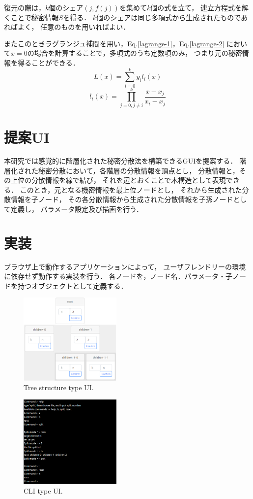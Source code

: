 \documentclass[twocolumn, fleqn, uplatex]{jsarticle}
\begin{document}
復元の際は，$k$個のシェア$(j,f(j))$を集めて$k$個の式を立て，%
連立方程式を解くことで秘密情報$S$を得る．
$k$個のシェアは同じ多項式から生成されたものであればよく，%
任意のものを用いればよい．

またこのときラグランジュ補間を用い，Eq.\ref{lagrange-1}，Eq.\ref{lagrange-2}%
において$x=0$の場合を計算することで，多項式のうち定数項のみ，%
つまり元の秘密情報を得ることができる．
%
\begin{equation}
L(x) = \sum_{i=0}^{k}y_{i}l_{i}(x) \label{lagrange-1}
\end{equation}
%
\begin{equation}
l_{i}(x) = \prod_{j=0,j{\neq}i}^{k}{\frac{x-x_{j}}{x_{i}-x_{j}}} \label{lagrange-2}
\end{equation}
%
\section{提案UI}
本研究では感覚的に階層化された秘密分散法を構築できるGUIを提案する．%
階層化された秘密分散において，各階層の分散情報を頂点とし，%
分散情報と，その上位の分散情報を線で結び，%
それを辺とおくことで木構造として表現できる．
このとき，元となる機密情報を最上位ノードとし，%
それから生成された分散情報を子ノード，%
その各分散情報から生成された分散情報を子孫ノードとして定義し，%
パラメータ設定及び描画を行う．

\section{実装}
ブラウザ上で動作するアプリケーションによって，%
ユーザフレンドリーの環境に依存せず動作する実装を行う．
各ノードを，ノード名．パラメータ・子ノードを持つオブジェクトとして定義する．

\begin{figure}[htbp]
	\centering
	\includegraphics[width=5cm]{treeUI.png}
		\caption{Tree structure type UI.}
		\label{fig:treeUI}
\end{figure}

\begin{figure}[htbp]
	\centering
	\includegraphics[width=5cm]{cliUI.png}
		\caption{CLI type UI.}
		\label{fig:cliUI}
\end{figure}
\end{document}
